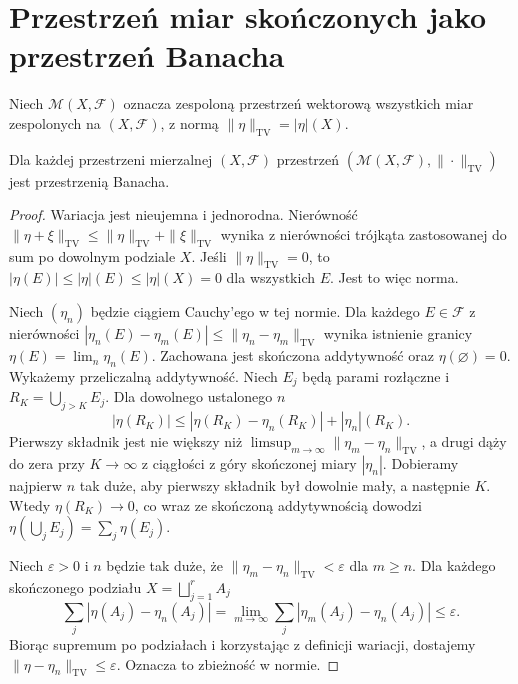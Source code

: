 \section{Przestrzeń miar skończonych jako przestrzeń Banacha}
\begin{definicja}
\label{def:complex-measures-space-16}
Niech $\mathcal M(X,\mathcal F)$ oznacza zespoloną
przestrzeń wektorową wszystkich miar zespolonych
na $(X,\mathcal F)$, z normą
$\|\eta\|_{\mathrm{TV}}=|\eta|(X)$.
\end{definicja}

\begin{twierdzenie}
\label{thm:complete-measures-16}
Dla każdej przestrzeni mierzalnej $(X,\mathcal F)$
przestrzeń $(\mathcal M(X,\mathcal F),\|\cdot\|_{\mathrm{TV}})$
jest przestrzenią Banacha.
\end{twierdzenie}
\begin{proof}
Wariacja jest nieujemna i jednorodna. Nierówność
$\|\eta+\xi\|_{\mathrm{TV}}\le\|\eta\|_{\mathrm{TV}}+
\|\xi\|_{\mathrm{TV}}$ wynika z nierówności trójkąta
zastosowanej do sum po dowolnym podziale $X$.
Jeśli $\|\eta\|_{\mathrm{TV}}=0$, to
$|\eta(E)|\le|\eta|(E)\le|\eta|(X)=0$ dla wszystkich $E$.
Jest to więc norma.

Niech $(\eta_n)$ będzie ciągiem Cauchy'ego w tej normie.
Dla każdego $E\in\mathcal F$ z nierówności
$|\eta_n(E)-\eta_m(E)|\le\|\eta_n-\eta_m\|_{\mathrm{TV}}$
wynika istnienie granicy $\eta(E)=\lim_n\eta_n(E)$.
Zachowana jest skończona addytywność oraz
$\eta(\varnothing)=0$. Wykażemy przeliczalną addytywność.
Niech $E_j$ będą parami rozłączne i
$R_K=\bigcup_{j>K}E_j$. Dla dowolnego ustalonego $n$
\[
|\eta(R_K)|\le|\eta(R_K)-\eta_n(R_K)|+|\eta_n|(R_K).
\]
Pierwszy składnik jest nie większy niż
$\limsup_{m\to\infty}\|\eta_m-\eta_n\|_{\mathrm{TV}}$,
a drugi dąży do zera przy $K\to\infty$ z ciągłości
z góry skończonej miary $|\eta_n|$. Dobieramy najpierw
$n$ tak duże, aby pierwszy składnik był dowolnie mały,
a następnie $K$. Wtedy $\eta(R_K)\to0$,
co wraz ze skończoną addytywnością dowodzi
$\eta(\bigcup_jE_j)=\sum_j\eta(E_j)$.

Niech $\varepsilon>0$ i $n$ będzie tak duże, że
$\|\eta_m-\eta_n\|_{\mathrm{TV}}<\varepsilon$ dla $m\ge n$.
Dla każdego skończonego podziału $X=\bigsqcup_{j=1}^rA_j$
\[
\sum_j|\eta(A_j)-\eta_n(A_j)|
=\lim_{m\to\infty}\sum_j|\eta_m(A_j)-\eta_n(A_j)|
\le\varepsilon.
\]
Biorąc supremum po podziałach i korzystając z definicji
wariacji, dostajemy $\|\eta-\eta_n\|_{\mathrm{TV}}
\le\varepsilon$. Oznacza to zbieżność w normie.
\end{proof}

